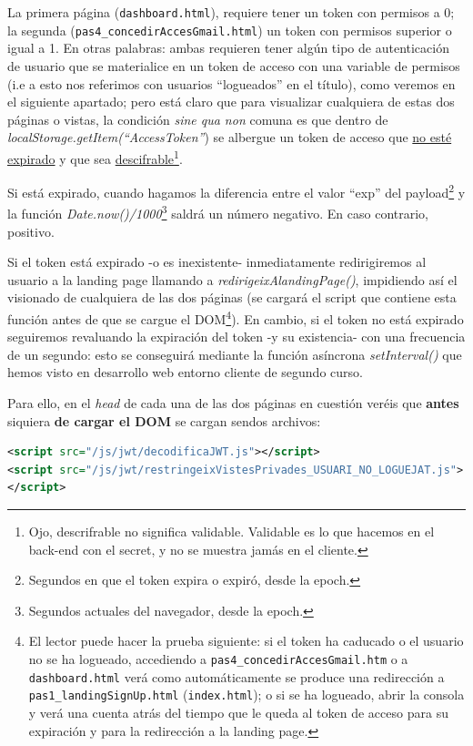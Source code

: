 \documentclass[a4paper,12pt]{report}
\begin{document}
	La primera página (\texttt{dashboard.html}), requiere tener un token con permisos a 0; la segunda (\texttt{pas4\_concedirAccesGmail.html}) un token con permisos superior o igual a 1. En otras palabras: ambas requieren tener algún tipo de autenticación de usuario que se materialice en un token de acceso con una variable de permisos (i.e a esto nos referimos con usuarios ``logueados'' en el título), como veremos en el siguiente apartado; pero está claro que para visualizar cualquiera de estas dos páginas o vistas, la condición \textit{sine qua non} comuna es que dentro de \textit{localStorage.getItem(``AccessToken''}) se albergue un token de acceso que \underline{no esté expirado} y que sea \underline{descifrable}\footnote{Ojo, descrifrable no significa validable. Validable es lo que hacemos en el back-end con el secret, y no se muestra jamás en el cliente.}.
	
	Si está expirado, cuando hagamos la diferencia entre el valor ``exp'' del payload\footnote{Segundos en que el token expira o expiró, desde la epoch.} y la función \textit{Date.now()/1000}\footnote{Segundos actuales del navegador, desde la epoch.} saldrá un número negativo. En caso contrario, positivo. 
	
	Si el token está expirado -o es inexistente- inmediatamente redirigiremos al usuario a la landing page llamando a \textit{redirigeixAlandingPage()}, impidiendo así el visionado de cualquiera de las dos páginas (se cargará el script que contiene esta función antes de que se cargue el DOM\footnote{El lector puede hacer la prueba siguiente: si el token ha caducado o el usuario no se ha logueado, accediendo a \texttt{pas4\_concedirAccesGmail.htm} o a \texttt{dashboard.html} verá como automáticamente se produce una redirección a \texttt{pas1\_landingSignUp.html} (\texttt{index.html}); o si se ha logueado, abrir la consola y verá una cuenta atrás del tiempo que le queda al token de acceso para su expiración y para la redirección a la landing page.}). En cambio, si el token no está expirado seguiremos revaluando la expiración del token -y su existencia- con una frecuencia de un segundo: esto se conseguirá mediante la función asíncrona \textit{setInterval()} que hemos visto en desarrollo web entorno cliente de segundo curso.
	
	Para ello, en el \textit{head} de cada una de las dos páginas en cuestión veréis que \textbf{antes} siquiera \textbf{de cargar el DOM} se cargan sendos archivos:
	
\begin{lstlisting}[language=xml, basicstyle=\ttfamily\footnotesize, keywordstyle=\color{magenta}]
<script src="/js/jwt/decodificaJWT.js"></script>
<script src="/js/jwt/restringeixVistesPrivades_USUARI_NO_LOGUEJAT.js">
</script>
\end{lstlisting}
\end{document}
